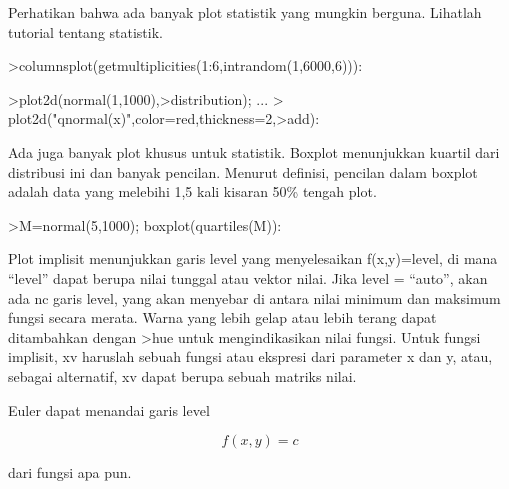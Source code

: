\documentclass[a4paper,10pt]{article}
\begin{document}
\begin{eulernotebook}
\begin{eulercomment}
\begin{eulercomment}
\begin{eulercomment}
\begin{eulercomment}
\begin{eulercomment}
\begin{eulercomment}
\begin{eulercomment}
\begin{eulercomment}
\begin{eulercomment}
\begin{eulercomment}
\begin{eulercomment}
Perhatikan bahwa ada banyak plot statistik yang mungkin berguna.
Lihatlah tutorial tentang statistik.
\end{eulercomment}
\begin{eulerprompt}
>columnsplot(getmultiplicities(1:6,intrandom(1,6000,6))):
\end{eulerprompt}
\begin{eulerprompt}
>plot2d(normal(1,1000),>distribution); ...
>  plot2d("qnormal(x)",color=red,thickness=2,>add):
\end{eulerprompt}
\begin{eulercomment}
Ada juga banyak plot khusus untuk statistik. Boxplot menunjukkan
kuartil dari distribusi ini dan banyak pencilan. Menurut definisi,
pencilan dalam boxplot adalah data yang melebihi 1,5 kali kisaran 50\%
tengah plot.
\end{eulercomment}
\begin{eulerprompt}
>M=normal(5,1000); boxplot(quartiles(M)):
\end{eulerprompt}
\begin{eulercomment}
Plot implisit menunjukkan garis level yang menyelesaikan f(x,y)=level,
di mana “level” dapat berupa nilai tunggal atau vektor nilai. Jika
level = “auto”, akan ada nc garis level, yang akan menyebar di antara
nilai minimum dan maksimum fungsi secara merata. Warna yang lebih
gelap atau lebih terang dapat ditambahkan dengan \textgreater{}hue untuk
mengindikasikan nilai fungsi. Untuk fungsi implisit, xv haruslah
sebuah fungsi atau ekspresi dari parameter x dan y, atau, sebagai
alternatif, xv dapat berupa sebuah matriks nilai.

Euler dapat menandai garis level

\end{eulercomment}
\begin{eulerformula}
\[
f(x,y) = c
\]
\end{eulerformula}
\begin{eulercomment}
dari fungsi apa pun.


\end{eulercomment}
\end{eulercomment}
\end{eulercomment}
\end{eulercomment}
\end{eulercomment}
\end{eulercomment}
\end{eulercomment}
\end{eulercomment}
\end{eulercomment}
\end{eulercomment}
\end{eulercomment}
\end{eulernotebook}
\end{document}
